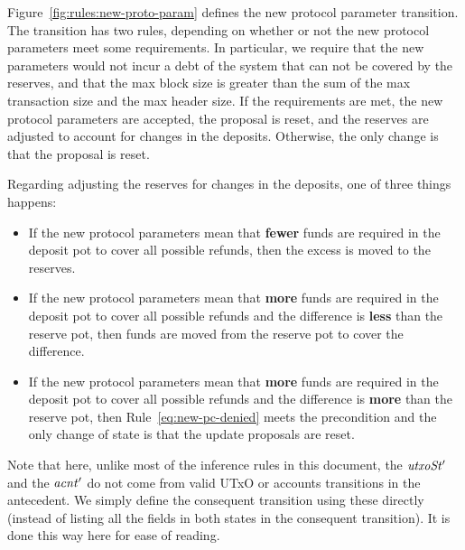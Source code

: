 Figure~\ref{fig:rules:new-proto-param} defines the new protocol parameter transition.
The transition has two rules, depending on whether or not the new protocol parameters
meet some requirements.
In particular, we require that the new parameters would not incur a debt of the system that
can not be covered by the reserves, and that the max block size is greater than the sum of the
max transaction size and the max header size.
If the requirements are met, the new protocol parameters are accepted, the proposal is reset,
and the reserves are adjusted to account for changes in the deposits.
Otherwise, the only change is that the proposal is reset.

Regarding adjusting the reserves for changes in the deposits, one of three things happens:

\begin{itemize}
  \item If the new protocol parameters mean that \textbf{fewer} funds are required in the
    deposit pot to cover all possible refunds, then the excess is moved to the reserves.

  \item If the new protocol parameters mean that \textbf{more} funds are required in the
    deposit pot to cover all possible refunds and the difference is \textbf{less} than
    the reserve pot, then funds are moved from the reserve pot to cover the difference.

  \item If the new protocol parameters mean that \textbf{more} funds are required in the
    deposit pot to cover all possible refunds and the difference is \textbf{more} than
    the reserve pot, then Rule~\ref{eq:new-pc-denied} meets the precondition and the
    only change of state is that the update proposals are reset.
\end{itemize}

Note that here, unlike most of the inference rules in this document,
the $\mathit{utxoSt'}$ and the $\mathit{acnt'}$ do not come from valid UTxO or
accounts transitions in the antecedent. We simply define the consequent
transition using these directly (instead of listing all the fields in both
states in the consequent transition). It is done this way here
for ease of reading.

